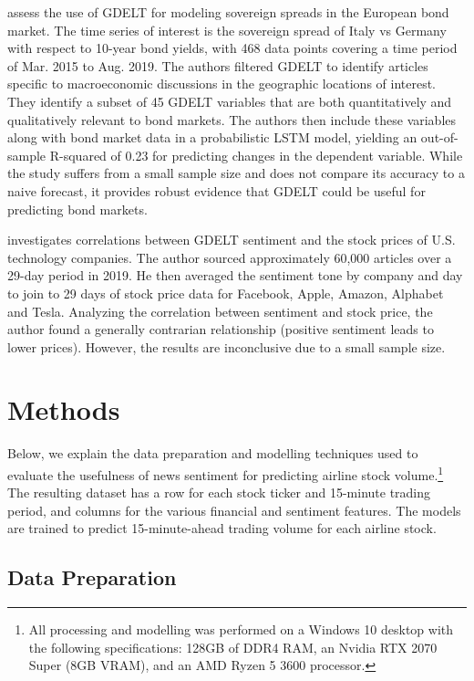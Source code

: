 \documentclass[12pt]{article}
\begin{document}
\textcite{consoli2021information} assess the use of GDELT for modeling sovereign spreads in the European bond market. The time series of interest is the sovereign spread of Italy vs Germany with respect to 10-year bond yields, with 468 data points covering a time period of Mar. 2015 to Aug. 2019. The authors filtered GDELT to identify articles specific to macroeconomic discussions in the geographic locations of interest. They identify a subset of 45 GDELT variables that are both quantitatively and qualitatively relevant to bond markets. The authors then include these variables along with bond market data in a probabilistic LSTM model, yielding an out-of-sample R-squared of 0.23 for predicting changes in the dependent variable. While the study suffers from a small sample size and does not compare its accuracy to a naive forecast, it provides robust evidence that GDELT could be useful for predicting bond markets.

\textcite{jakel2019using} investigates correlations between GDELT sentiment and the stock prices of U.S. technology companies. The author sourced approximately 60,000 articles over a 29-day period in 2019. He then averaged the sentiment tone by company and day to join to 29 days of stock price data for Facebook, Apple, Amazon, Alphabet and Tesla. Analyzing the correlation between sentiment and stock price, the author found a generally contrarian relationship (positive sentiment leads to lower prices). However, the results are inconclusive due to a small sample size.

\section{Methods}
\label{section:methods}

Below, we explain the data preparation and modelling techniques used to evaluate the usefulness of news sentiment for predicting airline stock volume.\footnote{All processing and modelling was performed on a Windows 10 desktop with the following specifications: 128GB of DDR4 RAM, an Nvidia RTX 2070 Super (8GB VRAM), and an AMD Ryzen 5 3600 processor.} The resulting dataset has a row for each stock ticker and 15-minute trading period, and columns for the various financial and sentiment features. The models are trained to predict 15-minute-ahead trading volume for each airline stock.

\subsection{Data Preparation}
\end{document}

